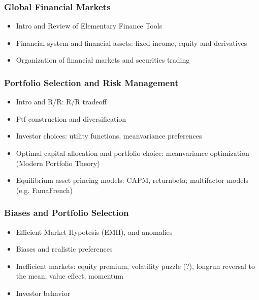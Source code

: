 \documentclass[letterpaper,10pt,english]{jupyterBook}
\begin{document}
\subsubsection*{Global Financial Markets}
\begin{itemize}
\item {} 
\sphinxAtStartPar
Intro and Review of Elementary Finance Tools

\item {} 
\sphinxAtStartPar
Financial system and financial assets: fixed income, equity and derivatives

\item {} 
\sphinxAtStartPar
Organization of financial markets and securities trading

\end{itemize}
\subsubsection*{Portfolio Selection and Risk Management}
\begin{itemize}
\item {} 
\sphinxAtStartPar
Intro and R/R: R/R trade\sphinxhyphen{}off

\item {} 
\sphinxAtStartPar
Ptf construction and diversification

\item {} 
\sphinxAtStartPar
Investor choices: utility functions, mean\sphinxhyphen{}variance preferences

\item {} 
\sphinxAtStartPar
Optimal capital allocation and portfolio choice: mean\sphinxhyphen{}variance optimization (Modern Portfolio Theory)

\item {} 
\sphinxAtStartPar
Equilibrium asset princing models: CAPM, return\sphinxhyphen{}beta; multi\sphinxhyphen{}factor models (e.g. Fama\sphinxhyphen{}French)

\end{itemize}
\subsubsection*{Biases and Portfolio Selection}
\begin{itemize}
\item {} 
\sphinxAtStartPar
Efficient Market Hypotesis (EMH), and anomalies

\item {} 
\sphinxAtStartPar
Biases and realistic preferences

\item {} 
\sphinxAtStartPar
Inefficient markets: equity premium, volatility puzzle (?), long\sphinxhyphen{}run reversal to the mean, value effect, momentum

\item {} 
\sphinxAtStartPar
Investor behavior

\end{itemize}
\end{document}
